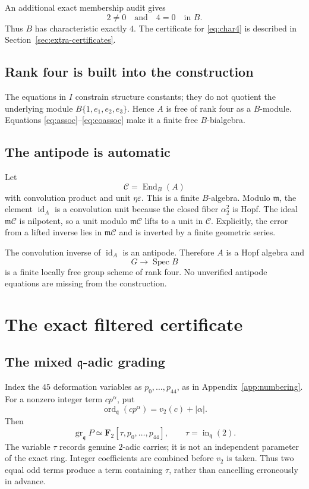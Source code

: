 \documentclass[11pt]{article}
\theoremstyle{remark}
\newcommand{\F}{\mathbf F}
\newcommand{\Spec}{\operatorname{Spec}}
\newcommand{\gr}{\operatorname{gr}}
\newcommand{\ord}{\operatorname{ord}}
\newcommand{\id}{\operatorname{id}}
\newcommand{\q}{\mathfrak q}
\newcommand{\m}{\mathfrak m}
\newcommand{\eps}{\varepsilon}
\begin{document}
An additional exact membership audit gives
\begin{equation}\label{eq:char4}
  2\ne0\quad\text{and}\quad4=0\quad\text{in }B.
\end{equation}
Thus \(B\) has characteristic exactly \(4\).  The certificate for
\eqref{eq:char4} is described in Section~\ref{sec:extra-certificates}.

\subsection{Rank four is built into the construction}

The equations in \(I\) constrain structure constants; they do not quotient
the underlying module \(B\{1,e_1,e_2,e_3\}\).  Hence \(A\) is free of rank
four as a \(B\)-module.  Equations \eqref{eq:assoc}--\eqref{eq:coassoc}
make it a finite free \(B\)-bialgebra.

\subsection{The antipode is automatic}

Let
\[
  \mathcal C=\operatorname{End}_B(A)
\]
with convolution product and unit \(\eta\eps\).  This is a finite \(B\)-algebra.
Modulo \(\m\), the element \(\id_A\) is a convolution unit because the closed
fiber \(\alpha_2^2\) is Hopf.  The ideal \(\m\mathcal C\) is nilpotent, so a
unit modulo \(\m\mathcal C\) lifts to a unit in \(\mathcal C\).  Explicitly,
the error from a lifted inverse lies in \(\m\mathcal C\) and is inverted by a
finite geometric series.

The convolution inverse of \(\id_A\) is an antipode.  Therefore \(A\) is a
Hopf algebra and
\[
  G\longrightarrow\Spec B
\]
is a finite locally free group scheme of rank four.  No unverified antipode
equations are missing from the construction.

\section{The exact filtered certificate}

\subsection{The mixed \texorpdfstring{\(\q\)}{q}-adic grading}

Index the \(45\) deformation variables as \(p_0,\ldots,p_{44}\), as in
Appendix~\ref{app:numbering}.  For a nonzero integer term \(c p^\alpha\), put
\[
  \ord_{\q}(c p^\alpha)=v_2(c)+|\alpha|.
\]
Then
\[
 \gr_{\q}P\simeq\F_2[\tau,p_0,\ldots,p_{44}],
 \qquad \tau=\operatorname{in}_{\q}(2).
\]
The variable \(\tau\) records genuine \(2\)-adic carries; it is not an
independent parameter of the exact ring.  Integer coefficients are combined
before \(v_2\) is taken.  Thus two equal odd terms produce a term containing
\(\tau\), rather than cancelling erroneously in advance.
\end{document}
